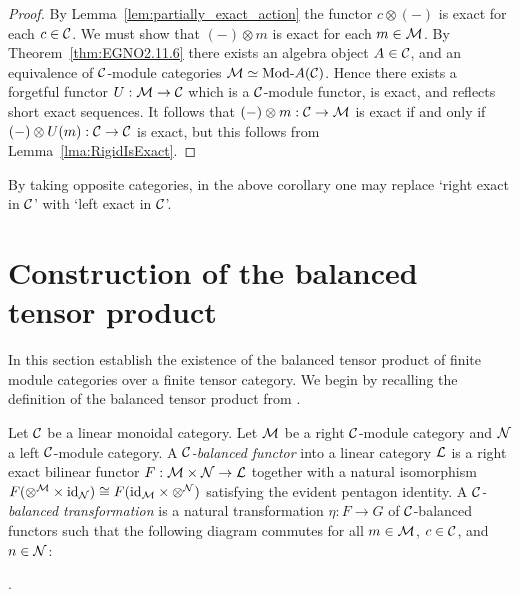 \documentclass{amsart}
\begin{document}
\begin{proof}
	By Lemma~\ref{lem:partially_exact_action} the functor $c \otimes (-)$ is exact for each $c \in \mathcal C$. We must show that $(-) \otimes m$ is exact for each $m \in \mathcal M$. By Theorem~\ref{thm:EGNO2.11.6} there exists an algebra object $A \in \mathcal C$, and an equivalence of $\mathcal C$-module categories $\cM \simeq \Mod{}{A}(\cC)$. Hence there exists a forgetful functor $U:\mathcal M \to \mathcal C$ which is a $\mathcal C$-module functor, is exact, and reflects short exact sequences. It follows that $(-) \otimes m: \mathcal C \to \mathcal M$ is exact if and only if $(-) \otimes U(m): \mathcal C \to \mathcal C$ is exact, but this follows from Lemma~\ref{lma:RigidIsExact}. 
\end{proof}

\begin{remark}
	By taking opposite categories, in the above corollary one may replace `right exact in $\mathcal C$' with `left exact in $\mathcal C$'. 
\end{remark}


\section{Construction of the balanced tensor product} \label{sec:tc-deligne}

In this section establish the existence of the balanced tensor product of finite module categories over a finite tensor category.  We begin by recalling the definition of the balanced tensor product from \cite{0909.3140}.


\begin{definition}
	Let $\mathcal C$ be a linear monoidal category. 
	Let $\mathcal M$ be a right $\mathcal C$-module category and $\mathcal N$ a left $\mathcal C$-module category. A {\em $\mathcal C$-balanced functor} into a linear category $\mathcal L$ is a right exact bilinear functor $F: \mathcal M \times \mathcal N \to \mathcal L$ together with a natural isomorphism $F(\otimes^{\mathcal M} \times \mathrm{id}_{\mathcal N}) \cong F(\mathrm{id}_{\mathcal M} \times \otimes^{\mathcal N})$ satisfying the evident pentagon identity. 
	A {\em $\mathcal C$-balanced transformation} is a natural transformation $\eta:F \to G$ of $\mathcal C$-balanced functors such that the following diagram commutes for all $m \in \mathcal M$, $c \in \mathcal C$, and $n \in \mathcal N$:
\begin{center}
.
\end{center}
\end{definition}
\end{document}
